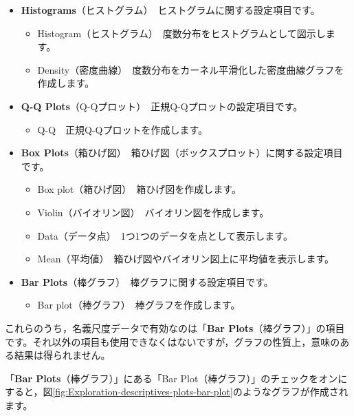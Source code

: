 \documentclass[
  12pt,
  a5jpaper,
  lualatex, ja=standard]{bxjsbook}
\providecommand{\tightlist}{%
  \setlength{\itemsep}{0pt}\setlength{\parskip}{0pt}}
\newenvironment{jmvsettings}{%
	\begin{center}%
	\begin{tcolorbox}[%
		title=設定項目,
		colframe=gmoji,
		colbacktitle=gmoji,
		colback=gmoji!2!white,
		breakable,
		width=.9\textwidth,
		]\small\addtolength{\leftmargini}{-3\labelsep}%
	}%
	{\end{tcolorbox}\end{center}}
\begin{document}
\begin{jmvsettings}

\begin{itemize}
\tightlist
\item
  \textbf{Histograms}（ヒストグラム）　ヒストグラムに関する設定項目です。

  \begin{itemize}
  \tightlist
  \item
    Histogram（ヒストグラム）　度数分布をヒストグラムとして図示します。
  \item
    Density（密度曲線）　度数分布をカーネル平滑化した密度曲線グラフを作成します。
  \end{itemize}
\item
  \textbf{Q-Q Plots}（Q-Qプロット）　正規Q-Qプロットの設定項目です。

  \begin{itemize}
  \tightlist
  \item
    Q-Q　正規Q-Qプロットを作成します。
  \end{itemize}
\item
  \textbf{Box Plots}（箱ひげ図）　箱ひげ図（ボックスプロット）に関する設定項目です。

  \begin{itemize}
  \tightlist
  \item
    Box plot（箱ひげ図）　箱ひげ図を作成します。
  \item
    Violin（バイオリン図）　バイオリン図を作成します。
  \item
    Data（データ点）　1つ1つのデータを点として表示します。
  \item
    Mean（平均値）　箱ひげ図やバイオリン図上に平均値を表示します。
  \end{itemize}
\item
  \textbf{Bar Plots}（棒グラフ）　棒グラフに関する設定項目です。

  \begin{itemize}
  \tightlist
  \item
    Bar plot（棒グラフ）　棒グラフを作成します。
  \end{itemize}
\end{itemize}

\end{jmvsettings}

これらのうち，名義尺度データで有効なのは「\textbf{Bar Plots}（棒グラフ）」の項目です。それ以外の項目も使用できなくはないですが，グラフの性質上，意味のある結果は得られません。

「\textbf{Bar Plots}（棒グラフ）」にある「Bar Plot（棒グラフ）」のチェックをオンにすると，図\ref{fig:Exploration-descriptives-plots-bar-plot}のようなグラフが作成されます。
\end{document}

